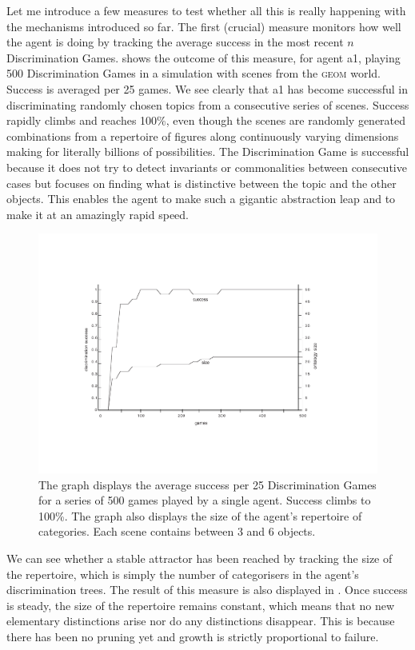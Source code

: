 Let me introduce a few measures 
to test whether all this is really happening with the 
mechanisms introduced so far.
The first (crucial) measure monitors 
how well the agent is doing by tracking
the average success in the most recent $n$ Discrimination Games. 
 shows the outcome of this measure, for 
agent {\bfshape a1}, playing 500 Discrimination Games in a
simulation with scenes from the \textsc{geom} world. 
Success is averaged per 25 games. We see clearly that {\bfshape a1}
has become successful in discriminating randomly chosen topics
from a consecutive series of scenes. Success rapidly climbs and
reaches 100\%, even though the scenes are randomly
generated combinations from a repertoire of figures
along continuously varying 
dimensions making for literally billions of possibilities. 
The Discrimination Game is successful because it does 
not try to detect invariants or commonalities between consecutive 
cases but focuses on finding what is distinctive between the topic 
and the other objects. This enables the agent to make
such a gigantic abstraction leap and to make it at an amazingly 
rapid speed. 

\begin{figure}[htbp]
  \centerline{\includegraphics[width=\textwidth]{chap4/figs/avsuc.pdf}}
\caption{\label{avsuc}The graph displays the 
average success per 25 Discrimination Games for a
series of 500 games played by a single agent. Success climbs
to 100\%. The graph also displays the size of the 
agent's repertoire of categories. Each scene contains
between 3 and 6 objects.}
\end{figure}

We can see whether a stable attractor has been reached by 
tracking the size of the repertoire, which is
simply the number of 
categorisers in the agent's discrimination trees. 
The result of this measure is also displayed in 
. Once success is steady, the
size of the repertoire remains 
constant, which means that no new 
elementary distinctions arise nor do any distinctions
disappear. This is because there has been no pruning yet and 
growth is strictly proportional to failure. 

